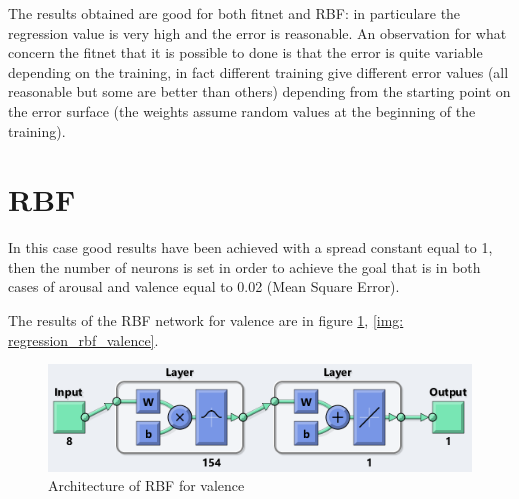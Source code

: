 \documentclass[a4paper]{report}
\begin{document}
\noindent The results obtained are good for both fitnet and RBF: in particulare the regression value is very high and the error is reasonable. An observation for what concern the fitnet that it is possible to done is that the error is quite variable depending on the training, in fact different training give different error values (all reasonable but some are better than others) depending from the starting point on the error surface (the weights assume random values at the beginning of the training).

\newpage
	\section{RBF}
	\noindent In this case good results have been achieved with a spread constant equal to 1, then the number of neurons is set in order to achieve the goal that is in both cases of arousal and valence equal to 0.02 (Mean Square Error).
	
	\noindent The results of the RBF network for valence are in figure \ref{img: rbf_valence}, \ref{img: regression_rbf_valence}.
	
	\vspace{1.5cm}
	\begin{figure}[htbp]
		\centering
		\includegraphics[scale=1]{img/rbf_valence.png}
		\caption{Architecture of RBF for valence}
		\label{img: rbf_valence}
	\end{figure}
	
\end{document}
